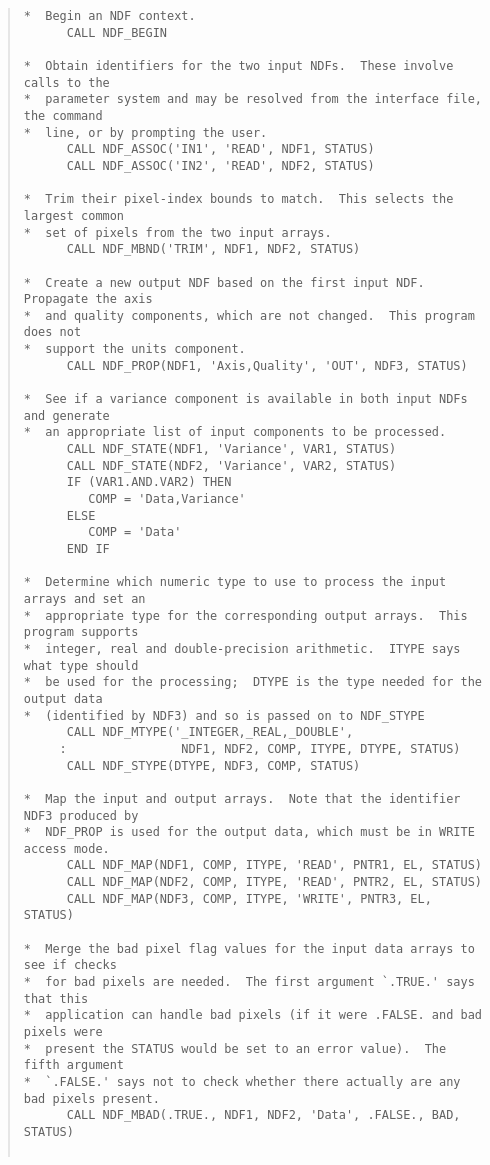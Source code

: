\begin{quote}
\begin{small}
\begin{verbatim}
*  Begin an NDF context.
      CALL NDF_BEGIN

*  Obtain identifiers for the two input NDFs.  These involve calls to the
*  parameter system and may be resolved from the interface file, the command
*  line, or by prompting the user.
      CALL NDF_ASSOC('IN1', 'READ', NDF1, STATUS)
      CALL NDF_ASSOC('IN2', 'READ', NDF2, STATUS)

*  Trim their pixel-index bounds to match.  This selects the largest common
*  set of pixels from the two input arrays.
      CALL NDF_MBND('TRIM', NDF1, NDF2, STATUS)

*  Create a new output NDF based on the first input NDF.  Propagate the axis
*  and quality components, which are not changed.  This program does not
*  support the units component.
      CALL NDF_PROP(NDF1, 'Axis,Quality', 'OUT', NDF3, STATUS)

*  See if a variance component is available in both input NDFs and generate
*  an appropriate list of input components to be processed.
      CALL NDF_STATE(NDF1, 'Variance', VAR1, STATUS)
      CALL NDF_STATE(NDF2, 'Variance', VAR2, STATUS)
      IF (VAR1.AND.VAR2) THEN
         COMP = 'Data,Variance'
      ELSE
         COMP = 'Data'
      END IF

*  Determine which numeric type to use to process the input arrays and set an
*  appropriate type for the corresponding output arrays.  This program supports
*  integer, real and double-precision arithmetic.  ITYPE says what type should
*  be used for the processing;  DTYPE is the type needed for the output data
*  (identified by NDF3) and so is passed on to NDF_STYPE
      CALL NDF_MTYPE('_INTEGER,_REAL,_DOUBLE',
     :                NDF1, NDF2, COMP, ITYPE, DTYPE, STATUS)
      CALL NDF_STYPE(DTYPE, NDF3, COMP, STATUS)

*  Map the input and output arrays.  Note that the identifier NDF3 produced by
*  NDF_PROP is used for the output data, which must be in WRITE access mode.
      CALL NDF_MAP(NDF1, COMP, ITYPE, 'READ', PNTR1, EL, STATUS)
      CALL NDF_MAP(NDF2, COMP, ITYPE, 'READ', PNTR2, EL, STATUS)
      CALL NDF_MAP(NDF3, COMP, ITYPE, 'WRITE', PNTR3, EL, STATUS)

*  Merge the bad pixel flag values for the input data arrays to see if checks
*  for bad pixels are needed.  The first argument `.TRUE.' says that this
*  application can handle bad pixels (if it were .FALSE. and bad pixels were
*  present the STATUS would be set to an error value).  The fifth argument
*  `.FALSE.' says not to check whether there actually are any bad pixels present.
      CALL NDF_MBAD(.TRUE., NDF1, NDF2, 'Data', .FALSE., BAD, STATUS)


\end{verbatim}
\end{small}
\end{quote}

